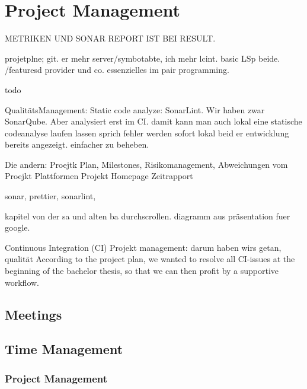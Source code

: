 \section{Project Management}
\label{section:project_management}

METRIKEN UND SONAR REPORT IST BEI RESULT.


projetplne; git. er mehr server/symbotabte, ich mehr lcint.
basic LSp beide. /featuresd provider und co. essenzielles im pair programming.

todo

QualitätsManagement: Static code analyze: SonarLint. \cite{sonar-lint}
Wir haben zwar SonarQube. Aber analysiert erst im CI.
damit kann man auch lokal eine statische codeanalyse laufen lassen sprich fehler werden sofort lokal beid er
entwicklung bereits angezeigt. einfacher zu beheben.


Die andern:
Proejtk Plan, Milestones, Risikomanagement, Abweichungen vom Proejkt Plattformen
Projekt Homepage
Zeitrapport



sonar, prettier, sonarlint,

kapitel von der sa und alten ba durchscrollen.
diagramm aus präsentation fuer google.

Continuous Integration (CI) 
Projekt management: darum haben wirs getan, qualität
According to the project plan, we wanted to resolve all CI-issues at the beginning of the bachelor thesis, so that we can then profit by a supportive workflow.



\subsection{Meetings}

\subsection{Time Management}
\subsubsection{Project Management}


